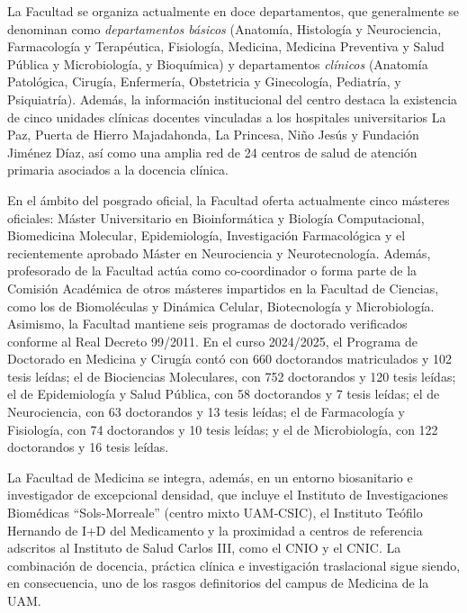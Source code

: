 \documentclass[
  11pt,
  a4paper,
  twoside]{scrreprt}
\begin{document}
La Facultad se organiza actualmente en doce departamentos, que
generalmente se denominan como \emph{departamentos básicos} (Anatomía,
Histología y Neurociencia, Farmacología y Terapéutica, Fisiología,
Medicina, Medicina Preventiva y Salud Pública y Microbiología, y
Bioquímica) y departamentos \emph{clínicos} (Anatomía Patológica,
Cirugía, Enfermería, Obstetricia y Ginecología, Pediatría, y
Psiquiatría). Además, la información institucional del centro destaca la
existencia de cinco unidades clínicas docentes vinculadas a los
hospitales universitarios La Paz, Puerta de Hierro Majadahonda, La
Princesa, Niño Jesús y Fundación Jiménez Díaz, así como una amplia red
de 24 centros de salud de atención primaria asociados a la docencia
clínica.

En el ámbito del posgrado oficial, la Facultad oferta actualmente cinco
másteres oficiales: Máster Universitario en Bioinformática y Biología
Computacional, Biomedicina Molecular, Epidemiología, Investigación
Farmacológica y el recientemente aprobado Máster en Neurociencia y
Neurotecnología. Además, profesorado de la Facultad actúa como
co-coordinador o forma parte de la Comisión Académica de otros másteres
impartidos en la Facultad de Ciencias, como los de Biomoléculas y
Dinámica Celular, Biotecnología y Microbiología. Asimismo, la Facultad
mantiene seis programas de doctorado verificados conforme al Real
Decreto 99/2011. En el curso 2024/2025, el Programa de Doctorado en
Medicina y Cirugía contó con 660 doctorandos matriculados y 102 tesis
leídas; el de Biociencias Moleculares, con 752 doctorandos y 120 tesis
leídas; el de Epidemiología y Salud Pública, con 58 doctorandos y 7
tesis leídas; el de Neurociencia, con 63 doctorandos y 13 tesis leídas;
el de Farmacología y Fisiología, con 74 doctorandos y 10 tesis leídas; y
el de Microbiología, con 122 doctorandos y 16 tesis leídas.

La Facultad de Medicina se integra, además, en un entorno biosanitario e
investigador de excepcional densidad, que incluye el Instituto de
Investigaciones Biomédicas ``Sols‑Morreale'' (centro mixto UAM‑CSIC), el
Instituto Teófilo Hernando de I+D del Medicamento y la proximidad a
centros de referencia adscritos al Instituto de Salud Carlos III, como
el CNIO y el CNIC. La combinación de docencia, práctica clínica e
investigación traslacional sigue siendo, en consecuencia, uno de los
rasgos definitorios del campus de Medicina de la UAM.
\end{document}
